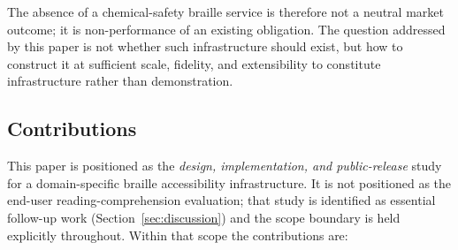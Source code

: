\documentclass[smallextended]{svjour3}
\begin{document}
The absence of a chemical-safety braille service is therefore not a neutral market outcome; it is non-performance of an existing obligation. The question addressed by this paper is not whether such infrastructure should exist, but how to construct it at sufficient scale, fidelity, and extensibility to constitute infrastructure rather than demonstration.

\subsection{Contributions}

This paper is positioned as the \emph{design, implementation, and public-release} study for a domain-specific braille accessibility infrastructure. It is not positioned as the end-user reading-comprehension evaluation; that study is identified as essential follow-up work (Section~\ref{sec:discussion}) and the scope boundary is held explicitly throughout. Within that scope the contributions are:
\end{document}
